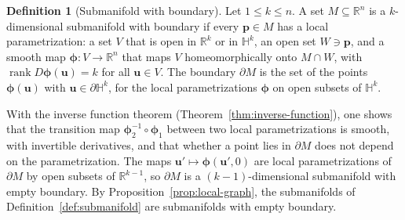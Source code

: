\documentclass[11pt]{article}
\theoremstyle{definition}
\newtheorem{definition}{Definition}[section]
\theoremstyle{plain}
\theoremstyle{remark}
\DeclareMathOperator{\rank}{rank}
\begin{document}
\begin{definition}[Submanifold with boundary]\label{def:manifold-boundary}
    Let $1 \leq k \leq n$. A set $M \subseteq \mathbb{R}^n$ is a $k$-dimensional submanifold with boundary if every $\mathbf{p} \in M$ has a local parametrization: a set $V$ that is open in $\mathbb{R}^k$ or in $\mathbb{H}^k$, an open set $W \ni \mathbf{p}$, and a smooth map $\boldsymbol{\phi}: V \to \mathbb{R}^n$ that maps $V$ homeomorphically onto $M \cap W$, with $\rank D\boldsymbol{\phi}(\mathbf{u}) = k$ for all $\mathbf{u} \in V$. The boundary $\partial M$ is the set of the points $\boldsymbol{\phi}(\mathbf{u})$ with $\mathbf{u} \in \partial\mathbb{H}^k$, for the local parametrizations $\boldsymbol{\phi}$ on open subsets of $\mathbb{H}^k$.
\end{definition}

With the inverse function theorem (Theorem~\ref{thm:inverse-function}), one shows that the transition map $\boldsymbol{\phi}_2^{-1} \circ \boldsymbol{\phi}_1$ between two local parametrizations is smooth, with invertible derivatives, and that whether a point lies in $\partial M$ does not depend on the parametrization. The maps $\mathbf{u}' \mapsto \boldsymbol{\phi}(\mathbf{u}', 0)$ are local parametrizations of $\partial M$ by open subsets of $\mathbb{R}^{k-1}$, so $\partial M$ is a $(k - 1)$-dimensional submanifold with empty boundary. By Proposition~\ref{prop:local-graph}, the submanifolds of Definition~\ref{def:submanifold} are submanifolds with empty boundary.
\end{document}
